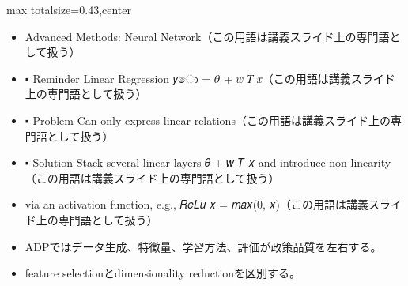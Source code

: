 \clearpage
{}
\begin{minipage}[t]{0.405\textwidth}
\begin{adjustbox}{max totalsize={\textwidth}{0.43\textheight},center}
\begin{minipage}{\textwidth}\scriptsize
{}\begin{itemize}
\item Advanced Methods: Neural Network（この用語は講義スライド上の専門語として扱う）
\item ▪ Reminder Linear Regression 𝑦ො = 𝜃 + 𝑤 𝑇 𝑥（この用語は講義スライド上の専門語として扱う）
\item ▪ Problem Can only express linear relations（この用語は講義スライド上の専門語として扱う）
\item ▪ Solution Stack several linear layers 𝜃 + 𝑤 𝑇 𝑥 and introduce non-linearity（この用語は講義スライド上の専門語として扱う）
\item via an activation function, e.g., 𝑅𝑒𝐿𝑢 𝑥 = 𝑚𝑎𝑥(0, 𝑥)（この用語は講義スライド上の専門語として扱う）
\end{itemize}\begin{itemize}
\item ADPではデータ生成、特徴量、学習方法、評価が政策品質を左右する。
\item feature selectionとdimensionality reductionを区別する。
\end{itemize}
\end{minipage}
\end{adjustbox}
\end{minipage}\hfill
